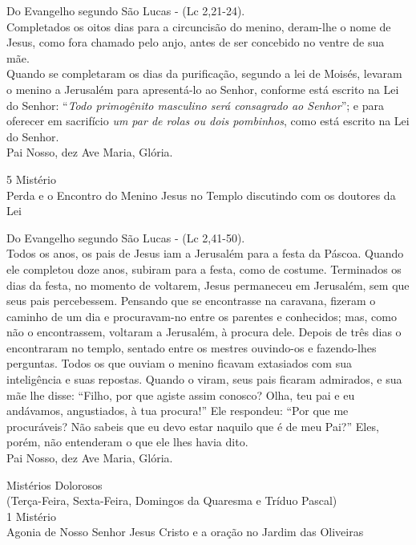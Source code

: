 \begin{flushleft}
    Do Evangelho segundo São Lucas - (\textcolor{VioletRed2}{Lc 2,21-24}). \\
    \hfill{} \break{}
    Completados os oitos dias para a circuncisão do menino, deram-lhe o nome de Jesus, como fora chamado pelo anjo, antes de ser concebido no ventre de sua mãe.
    \vspace{.2cm} \\
    Quando se completaram os dias da purificação, segundo a lei de Moisés, levaram o menino a Jerusalém para apresentá-lo ao Senhor, conforme está escrito na Lei do Senhor: ``\textit{Todo primogênito masculino será consagrado ao Senhor}''; e para oferecer em sacrifício \textit{um par de rolas ou dois pombinhos}, como está escrito na Lei do Senhor. \\
    \hfill{} \break{}
    Pai Nosso, dez Ave Maria, Glória.
\end{flushleft}
\begin{center}
    5\textordmasculine{} Mistério \\ Perda e o Encontro do Menino Jesus no Templo discutindo com os doutores da Lei
\end{center}
\begin{flushleft}
    Do Evangelho segundo São Lucas - (\textcolor{VioletRed2}{Lc 2,41-50}). \\
    \hfill{} \break{}
    Todos os anos, os pais de Jesus iam a Jerusalém para a festa da Páscoa. Quando ele completou doze anos, subiram para a festa, como de costume. Terminados os dias da festa, no momento de voltarem, Jesus permaneceu em Jerusalém, sem que seus pais percebessem. Pensando que se encontrasse na caravana, fizeram o caminho de um dia e procuravam-no entre os parentes e conhecidos; mas, como não o encontrassem, voltaram a Jerusalém, à procura dele. Depois de três dias o encontraram no templo, sentado entre os mestres ouvindo-os e fazendo-lhes perguntas. Todos os que ouviam o menino ficavam extasiados com sua inteligência e suas repostas. Quando o viram, seus pais ficaram admirados, e sua mãe lhe disse: ``Filho, por que agiste assim conosco? Olha, teu pai e eu andávamos, angustiados, à tua procura!'' Ele respondeu: ``Por que me procuráveis? Não sabeis que eu devo estar naquilo que é de meu Pai?'' Eles, porém, não entenderam o que ele lhes havia dito. \\
    \hfill{} \break{}
    Pai Nosso, dez Ave Maria, Glória.
\end{flushleft}
\newpage
\begin{center}
    Mistérios Dolorosos \\ \textcolor{VioletRed2}{\scriptsize{(Terça-Feira, Sexta-Feira, Domingos da Quaresma e Tríduo Pascal)}} \\
    \hfill{} \break{}
    1\textordmasculine{} Mistério \\ Agonia de Nosso Senhor Jesus Cristo e a oração no Jardim das Oliveiras
\end{center}
